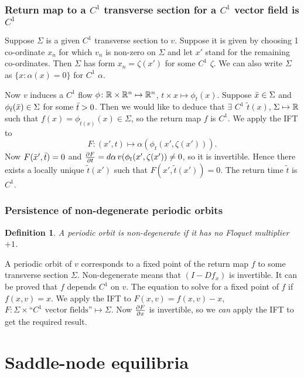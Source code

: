 \documentclass{notes}
\theoremstyle{plain}
\newtheorem*{definition}{Definition}
\begin{document}
\subsubsection*{Return map to a $C^1$ transverse section for a $C^1$ vector
field is $C^1$}
Suppose $\Sigma$ is a given $C^1$ transverse section to $v$.  Suppose it is
given by choosing 1 co-ordinate $x_n$ for which $v_n$ is non-zero on $\Sigma$
and let $x'$ stand for the remaining co-ordinates.  Then $\Sigma$ has form
$x_n = \zeta(x')$ for some $C^1$ $\zeta$.  We can also write $\Sigma$ as
$\{ x : \alpha(x) = 0 \}$ for $C^1$ $\alpha$.

Now $v$ induces a $C^1$ flow $\phi \colon \mathbb{R} \times \mathbb{R}^n \mapsto \mathbb{R}^n$,
$t \times x \mapsto \phi_t(x)$.  Suppose $\Bar{x} \in \Sigma$ and
$\phi_{\Bar{t}}(\Bar{x}) \in \Sigma$ for some $\Bar{t}>0$.  Then we
would like to deduce that $\exists$ $C^1$ $\tilde{t}(x)$, $\Sigma \mapsto
\mathbb{R}$ such that $f(x) = \phi_{\tilde{t}(x)}(x) \in \Sigma$, so the
return map $f$ is $C^1$.  We apply the IFT to
\[
F \colon ( x',t) \mapsto \alpha(\phi_t(x',\zeta(x'))).
\]
Now $F(\Bar{x}',\Bar{t}) = 0$ and $\frac{\partial F}{\partial t} = d\alpha\, v(\phi_t(x',\zeta(x'))
\neq 0$, so it is invertible.  Hence there exists a locally unique
$\tilde{t}(x')$ such that $F(x',\tilde{t}(x'))=0$.  The return time
$\tilde{t}$ is $C^1$.

\subsubsection*{Persistence of non-degenerate periodic orbits}

\begin{definition}
A periodic orbit is non-degenerate if it has no Floquet multiplier $+1$.
\end{definition}

A periodic orbit of $v$ corresponds to a fixed point of the return map $f$
to some transverse section $\Sigma$.  Non-degenerate means that
$(I - D f_x)$ is invertible.  It can be proved that $f$ depends $C^1$ on
$v$.  The equation to solve for a fixed point of $f$ if $f(x,v)=x$.  We
apply the IFT to $F(x,v) = f(x,v) - x$, $F \colon \Sigma \times 
\text{``$C^1$ vector fields''} \mapsto \Sigma$.  Now $\frac{\partial F}{\partial x}$ is
invertible, so we \emph{can} apply the IFT to get the required result.

\section{Saddle-node equilibria}
\end{document}
